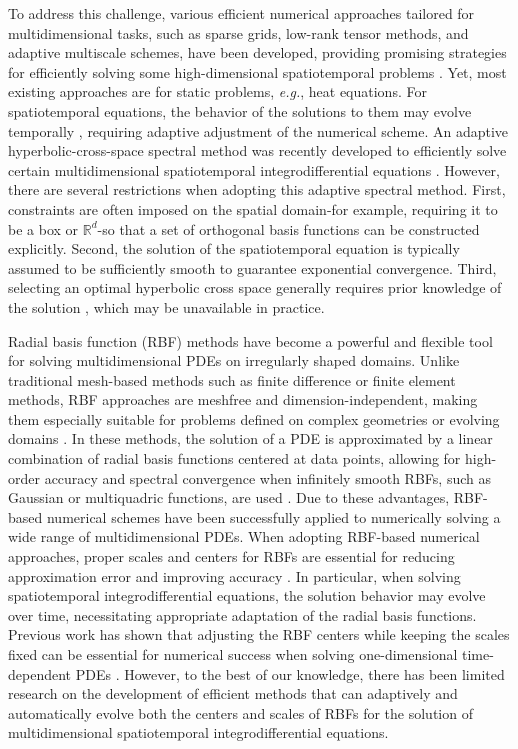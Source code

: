 To address this challenge, various efficient numerical approaches tailored for multidimensional tasks, such as sparse grids, low-rank tensor methods, and adaptive multiscale schemes, have been developed, providing promising strategies for efficiently solving some high-dimensional spatiotemporal problems \cite{hutzenthaler2020overcoming,bungartz2004sparse,bachmayr2023low}. Yet, most existing approaches are for static problems, \textit{e.g.}, heat equations. For spatiotemporal equations, the behavior of the solutions to them may evolve temporally \cite{chou2023adaptive,xia2021efficient}, requiring adaptive adjustment of the numerical scheme. An adaptive hyperbolic-cross-space spectral method was recently developed to efficiently solve certain multidimensional spatiotemporal integrodifferential equations \cite{deng2025adaptive,xia2024learning}. However, there are several restrictions when adopting this adaptive spectral method. First, constraints are often imposed on the spatial domain-for example, requiring it to be a box or $\mathbb{R}^d$-so that a set of orthogonal basis functions can be constructed explicitly. Second, the solution of the spatiotemporal equation is typically assumed to be sufficiently smooth to guarantee exponential convergence. Third, selecting an optimal hyperbolic cross space generally requires prior knowledge of the solution \cite{shen2010sparse,luo2013hermite}, which may be unavailable in practice.

Radial basis function (RBF) methods have become a powerful and flexible tool for solving multidimensional PDEs on irregularly shaped domains. Unlike traditional mesh-based methods such as finite difference or finite element methods, RBF approaches are meshfree and dimension-independent, making them especially suitable for problems defined on complex geometries or evolving domains \cite{fasshauer2007meshfree}. In these methods, the solution of a PDE is approximated by a linear combination of radial basis functions centered at data points, allowing for high-order accuracy and spectral convergence when infinitely smooth RBFs, such as Gaussian or multiquadric functions, are used \cite{flyer2009radial}. Due to these advantages, RBF-based numerical schemes have been successfully applied to numerically solving a wide range of multidimensional PDEs. When adopting RBF-based numerical approaches, proper scales and centers for RBFs are essential for reducing approximation error and improving accuracy \cite{billings2007generalized,chen2011numerical,zhang2017adaptive}. In particular, when solving spatiotemporal integrodifferential equations, the solution behavior may evolve over time, necessitating appropriate adaptation of the radial basis functions. Previous work has shown that adjusting the RBF centers while keeping the scales fixed can be essential for numerical success when solving one-dimensional time-dependent PDEs \cite{sarra2005adaptive}. However, to the best of our knowledge, there has been limited research on the development of efficient methods that can adaptively and automatically evolve both the centers and scales of RBFs for the solution of multidimensional spatiotemporal integrodifferential equations.

